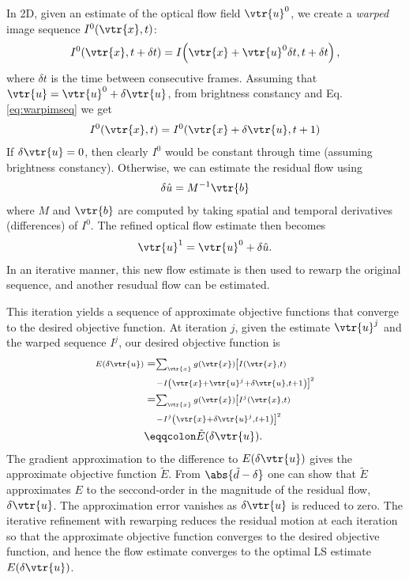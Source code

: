 \begin{compactdesc}
In 2D, given an estimate of the optical flow field $\vtr{u}^0$, we create a \emph{warped} image sequence $I^0(\vtr{x},t)$:
\begin{gather}
	I^0\!\left( \vtr{x},t+\delta t \right)=I\!\left(\vtr{x}+\vtr{u}^0\delta t, t+\delta t  \right),
	\label{eq:warpimseq}
\end{gather}
where $\delta t$ is the time between consecutive frames.  Assuming that $\vtr{u}=\vtr{u}^0+\delta \vtr{u}$, from brightness constancy and Eq. \ref{eq:warpimseq} we get
\begin{gather*}
	I^0(\vtr{x},t)=I^0(\vtr{x}+\delta\vtr{u},t+1)
\end{gather*}
If $\delta\vtr{u}=0$, then clearly $I^0$ would be constant through time (assuming brightness constancy). Otherwise, we can estimate the residual flow using 
\begin{gather}
	\delta\hat{u}=M^{-1}\vtr{b}
	\label{eq:compresflow}
\end{gather}
where $M$ and $\vtr{b}$ are computed by taking spatial and temporal derivatives (differences) of $I^0$. The refined optical flow estimate then becomes
\begin{gather*}
	\vtr{u}^1=\vtr{u}^0+\delta\hat{u}.
\end{gather*}
In an iterative manner, this new flow estimate is then used to rewarp the original sequence, and another resudual flow can be estimated.

This iteration yields a sequence of approximate objective functions that converge to the desired objective function. At iteration $j$, given the estimate $\vtr{u}^j$ and the warped sequence $I^j$, our desired objective function is 
\begin{align}
	\scriptstyle E(\delta\vtr{u})&=\scriptstyle\sum_{\vtr{x}}^{}g(\vtr{x})\left[I(\vtr{x},t)\vphantom{\scriptstyle\quad -I(\vtr{x}+\vtr{u}^j+\delta\vtr{u},t+1)}\right.\nonumber\\
	&\scriptstyle\left.\quad -I\left( \vtr{x}+\vtr{u}^j+\delta\vtr{u},t+1 \right)\scriptstyle\right]^2\nonumber\\
	&=\scriptstyle\sum_{\vtr{x}}^{}g(\vtr{x})\left[I^j(\vtr{x},t)\vphantom{\scriptstyle\quad -I^j(\vtr{x}+\delta\vtr{u},t+1)}\right.\nonumber\\
	&\scriptstyle\left.\quad -I^j\left( \vtr{x}+\delta\vtr{u}^j,t+1 \right)\scriptstyle\right]^2\nonumber\\
	&\eqqcolon \tilde{E}(\delta\vtr{u}).
	\label{eq:costfunction}
\end{align}
The gradient approximation to the difference to $E(\delta\vtr{u})$ gives the approximate objective function $\tilde{E}$. From $\abs{\tilde{d}-\delta}$ one can show that $\tilde{E}$ approximates $E$ to the seccond-order in the magnitude of the residual flow, $\delta\vtr{u}$. The approximation error vanishes as $\delta\vtr{u}$ is reduced to zero. The iterative refinement with rewarping reduces the residual motion at each iteration so that the approximate objective function converges to the desired objective function, and hence the flow estimate converges to the optimal LS estimate $E(\delta \vtr{u})$.


\end{compactdesc}
